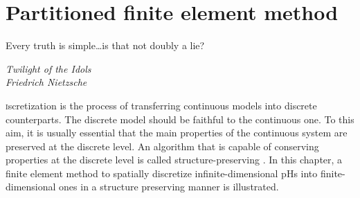 \chapter{Partitioned finite element method}

\epigraph{Every truth is simple\dots is that not doubly a lie?}{\textit{Twilight of the Idols \\ Friedrich Nietzsche}}

\minitoc

\lettrine{\color{theme}{D}}iscretization is the process of transferring continuous models into discrete counterparts. The discrete model should be faithful to the continuous one. To this aim, it is usually essential that the main properties of the continuous system are preserved at the discrete level. An algorithm that is capable of conserving properties at the discrete level is called structure-preserving \cite{christiansen2011}. In this chapter, a finite element method to spatially discretize infinite-dimensional pHs into finite-dimensional ones in a structure preserving manner is illustrated.

